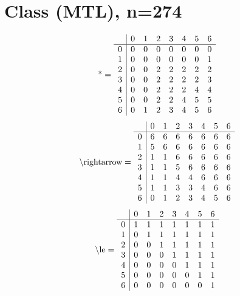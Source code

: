 \documentclass[11pt]{article}
\begin{document}
\section{Class (MTL), n=274}
\[\text{*} = 
\begin{array}{r | r r r r r r r}
 & 0 & 1 & 2 & 3 & 4 & 5 & 6 \\ \hline
0 & 0 & 0 & 0 & 0 & 0 & 0 & 0 \\
1 & 0 & 0 & 0 & 0 & 0 & 0 & 1 \\
2 & 0 & 0 & 2 & 2 & 2 & 2 & 2 \\
3 & 0 & 0 & 2 & 2 & 2 & 2 & 3 \\
4 & 0 & 0 & 2 & 2 & 2 & 4 & 4 \\
5 & 0 & 0 & 2 & 2 & 4 & 5 & 5 \\
6 & 0 & 1 & 2 & 3 & 4 & 5 & 6 \\
\end{array}
\]
\[\text{\textbackslash rightarrow} = 
\begin{array}{r | r r r r r r r}
 & 0 & 1 & 2 & 3 & 4 & 5 & 6 \\ \hline
0 & 6 & 6 & 6 & 6 & 6 & 6 & 6 \\
1 & 5 & 6 & 6 & 6 & 6 & 6 & 6 \\
2 & 1 & 1 & 6 & 6 & 6 & 6 & 6 \\
3 & 1 & 1 & 5 & 6 & 6 & 6 & 6 \\
4 & 1 & 1 & 4 & 4 & 6 & 6 & 6 \\
5 & 1 & 1 & 3 & 3 & 4 & 6 & 6 \\
6 & 0 & 1 & 2 & 3 & 4 & 5 & 6 \\
\end{array}
\]
\[\text{\textbackslash le} = 
\begin{array}{r | r r r r r r r}
 & 0 & 1 & 2 & 3 & 4 & 5 & 6 \\ \hline
0 & 1 & 1 & 1 & 1 & 1 & 1 & 1 \\
1 & 0 & 1 & 1 & 1 & 1 & 1 & 1 \\
2 & 0 & 0 & 1 & 1 & 1 & 1 & 1 \\
3 & 0 & 0 & 0 & 1 & 1 & 1 & 1 \\
4 & 0 & 0 & 0 & 0 & 1 & 1 & 1 \\
5 & 0 & 0 & 0 & 0 & 0 & 1 & 1 \\
6 & 0 & 0 & 0 & 0 & 0 & 0 & 1 \\
\end{array}
\]
\end{document}
